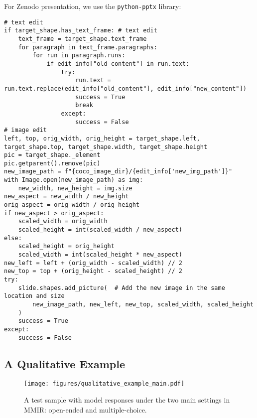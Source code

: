 For Zenodo presentation, we use the \texttt{python-pptx} library:

\begin{lstlisting}
# text edit
if target_shape.has_text_frame: # text edit
    text_frame = target_shape.text_frame
    for paragraph in text_frame.paragraphs:
        for run in paragraph.runs:
            if edit_info["old_content"] in run.text:
                try:
                    run.text = run.text.replace(edit_info["old_content"], edit_info["new_content"])
                    success = True
                    break
                except:
                    success = False
# image edit
left, top, orig_width, orig_height = target_shape.left, target_shape.top, target_shape.width, target_shape.height
pic = target_shape._element
pic.getparent().remove(pic)
new_image_path = f"{coco_image_dir}/{edit_info['new_img_path']}"
with Image.open(new_image_path) as img:
    new_width, new_height = img.size
new_aspect = new_width / new_height
orig_aspect = orig_width / orig_height
if new_aspect > orig_aspect:
    scaled_width = orig_width
    scaled_height = int(scaled_width / new_aspect)
else:
    scaled_height = orig_height
    scaled_width = int(scaled_height * new_aspect)
new_left = left + (orig_width - scaled_width) // 2
new_top = top + (orig_height - scaled_height) // 2
try:
    slide.shapes.add_picture(  # Add the new image in the same location and size
        new_image_path, new_left, new_top, scaled_width, scaled_height
    )
    success = True
except:
    success = False
\end{lstlisting}


\subsection{A Qualitative Example}
\label{appendix:sec:example_main settings}

\begin{figure}[h!]
\setlength\tabcolsep{0pt}
\setlength{\abovecaptionskip}{0.1cm}
    \centering
    \texttt{[image: figures/qualitative\_example\_main.pdf]}
    \caption{A test sample with model responses under the two main settings in MMIR: open-ended and multiple-choice.}
    \vspace{-10pt}
    \label{fig:ablation_count}
\end{figure}